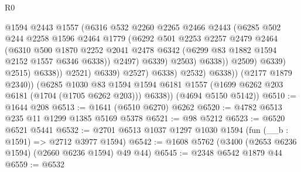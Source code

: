 \begin{lexlean}{R0}
\begin{coremodule}
                                      @1594
                                      @2443
                                      @1557
                                      (@6316
                                        @532
                                        @2260
                                        @2265
                                        @2466
                                        @2443
                                        (@6285
                                          @502
                                          @244
                                          @2258
                                          @1596
                                          @2464
                                          @1779
                                          (@6292
                                            @501
                                            @2253
                                            @2257
                                            @2479
                                            @2464
                                            (@6310
                                              @500
                                              @1870
                                              @2252
                                              @2041
                                              @2478
                                              @6342
                                              (@6299 @83 @1882 @1594 @2152 @1557 @6346 @6338))
                                            @2497)
                                          @6339)
                                        @2503)
                                      @6338))
                                  @2509)
                                @6339)
                              @2515)
                            @6338))
                        @2521)
                      @6339)
                    @2527)
                  @6338)
                @2532)
              @6338))
          (@2177 @1879 @2340))
        (@6285
          @1030
          @83
          @1594
          @1594
          @6181
          @1557
          (@1699 @6262 @203 @6181 (@1704 (@1705 @6262 @203)))
          @6338))
      (@4694 @5150 @5142))
@6510 := @1644 @208
@6513 := @1641 (@6510 @6270) @6262
@6520 := @4782 @6513 @235 @11 @1299 @1385 @5169 @5378
@6521 := @98 @5212
@6523 := @6520 @6521 @5441
@6532 := @2701 @6513 @1037 @1297 @1030 @1594 (fun (__b : @1591) => @2712 @3977 @1594)
@6542 := @1608 @5762 (@3400 (@2653 @6236 @1594) (@2660 @6236 @1594) @49 @44)
@6545 := @2348 @6542 @1879 @44
@6559 := @6532

\end{coremodule}
\end{lexlean}
